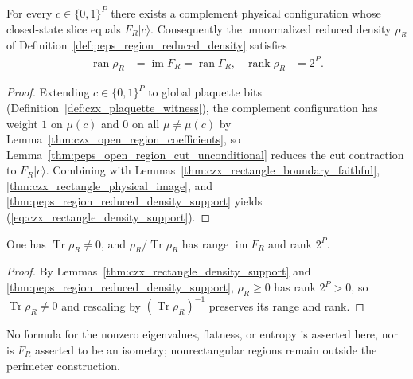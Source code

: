 \begin{lemma}%
    \label{thm:czx_rectangle_density_support}
    \leanok
    For every $c\in\{0,1\}^P$ there exists a complement physical configuration
    whose closed-state slice equals $F_R|c\rangle$. Consequently the
    unnormalized reduced density $\rho_R$ of
    Definition~\ref{def:peps_region_reduced_density} satisfies
    \begin{align}
        \operatorname{ran}\rho_R
         & =\operatorname{im}F_R=\operatorname{ran}\Gamma_R,
         & \operatorname{rank}\rho_R                         & =2^P.
        \label{eq:czx_rectangle_density_support}
    \end{align}
\end{lemma}
\begin{proof}\leanok
    Extending $c\in\{0,1\}^P$ to global plaquette bits
    (Definition~\ref{def:czx_plaquette_witness}), the complement configuration
    has weight $1$ on $\mu(c)$ and $0$ on all $\mu\ne\mu(c)$ by
    Lemma~\ref{thm:czx_open_region_coefficients}, so
    Lemma~\ref{thm:peps_open_region_cut_unconditional} reduces the cut
    contraction to $F_R|c\rangle$. Combining with
    Lemmas~\ref{thm:czx_rectangle_boundary_faithful},
    \ref{thm:czx_rectangle_physical_image}, and
    \ref{thm:peps_region_reduced_density_support} yields
    (\ref{eq:czx_rectangle_density_support}).
\end{proof}

\begin{lemma}%
    \label{thm:czx_rectangle_density_normalization}
    \leanok
    One has $\operatorname{Tr}\rho_R\ne0$, and $\rho_R/\operatorname{Tr}\rho_R$
    has range $\operatorname{im}F_R$ and rank $2^P$.
\end{lemma}
\begin{proof}\leanok
    By Lemmas~\ref{thm:czx_rectangle_density_support} and
    \ref{thm:peps_region_reduced_density_support}, $\rho_R\ge0$ has rank
    $2^P>0$, so $\operatorname{Tr}\rho_R\ne0$ and rescaling by
    $(\operatorname{Tr}\rho_R)^{-1}$ preserves its range and rank.
\end{proof}

No formula for the nonzero eigenvalues, flatness, or entropy is asserted here,
nor is $F_R$ asserted to be an isometry; nonrectangular regions remain outside
the perimeter construction.
